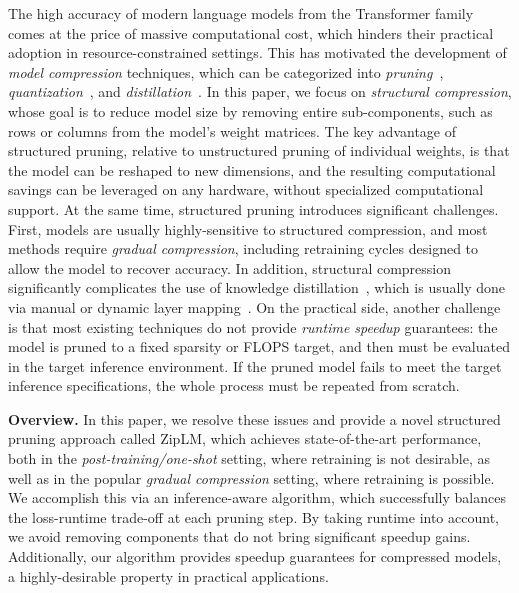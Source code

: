 \documentclass{article}
\newcommand{\ourmethod}{ZipLM}
\theoremstyle{plain}
\theoremstyle{definition}
\theoremstyle{remark}
\renewcommand{\paragraph}[1]{ \noindent \textbf{#1}}
\begin{document}
The high accuracy of modern language models from the Transformer family~\citep{Vaswani2017AttentionIA} comes at the price of massive computational cost, which hinders their practical adoption in resource-constrained settings. 
This has motivated the development of \emph{model compression} techniques, which can be categorized into \emph{pruning}~\citep{hoefler2021}, \emph{quantization}~\citep{gholami2021survey}, and \emph{distillation}~\citep{gou2021knowledge}. In this paper, we focus on \emph{structural compression}, 
whose goal is to reduce model size by removing entire sub-components, such as rows or columns from the model's weight matrices. 
The key advantage of structured pruning, relative to unstructured pruning of individual weights, is that the model can be reshaped to new dimensions, and the resulting computational savings can be leveraged on any hardware, without specialized computational support. At the same time, structured pruning introduces significant challenges. 
First, models are usually highly-sensitive to structured compression, and most methods require \emph{gradual compression}, including retraining cycles designed to allow the model to recover accuracy.
In addition, structural compression significantly complicates the use of knowledge distillation~\citep{Hinton2015DistillingTK}, which is usually done via manual or dynamic layer mapping~\citep{Jiao2020TinyBERTDB, xia2022structured}. 
On the practical side, another challenge is that most existing techniques do not provide \emph{runtime speedup} guarantees: the model is pruned to a fixed sparsity or FLOPS target, and then must be evaluated in the target inference environment. 
If the pruned model fails to meet the target inference specifications, the whole process must be repeated from scratch. 

\paragraph{Overview.}  
In this paper, we resolve these issues and provide a novel structured pruning approach called \ourmethod{}, which achieves state-of-the-art performance, both in the \emph{post-training/one-shot} setting, where retraining is not desirable, as well as in the popular \emph{gradual compression} setting, where retraining is possible.
We accomplish this via an inference-aware algorithm, which successfully balances the loss-runtime trade-off at each pruning step. By taking runtime into account, we avoid removing components that do not bring significant speedup gains. Additionally, our algorithm provides speedup guarantees for compressed models, a highly-desirable property in practical applications.
\end{document}
